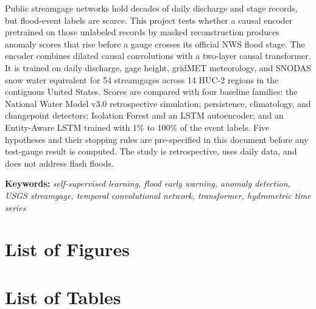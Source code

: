\documentclass[12pt]{report}
\begin{document}
Public streamgage networks hold decades of daily discharge and stage records, but flood-event labels are scarce. This project tests whether a causal encoder pretrained on those unlabeled records by masked reconstruction produces anomaly scores that rise before a gauge crosses its official NWS flood stage. The encoder combines dilated causal convolutions with a two-layer causal transformer. It is trained on daily discharge, gage height, gridMET meteorology, and SNODAS snow water equivalent for 54 streamgages across 14 HUC-2 regions in the contiguous United States. Scores are compared with four baseline families: the National Water Model v3.0 retrospective simulation; persistence, climatology, and changepoint detectors; Isolation Forest and an LSTM autoencoder; and an Entity-Aware LSTM trained with 1\% to 100\% of the event labels. Five hypotheses and their stopping rules are pre-specified in this document before any test-gauge result is computed. The study is retrospective, uses daily data, and does not address flash floods.

\bigskip
\noindent\textbf{Keywords:} \textit{self-supervised learning, flood early warning, anomaly detection, USGS streamgage, temporal convolutional network, transformer, hydrometric time series}
\newpage
\tableofcontents


\chapter*{List of Figures}
\listoffigures
\newpage

\chapter*{List of Tables}
\listoftables
\newpage
\end{document}
